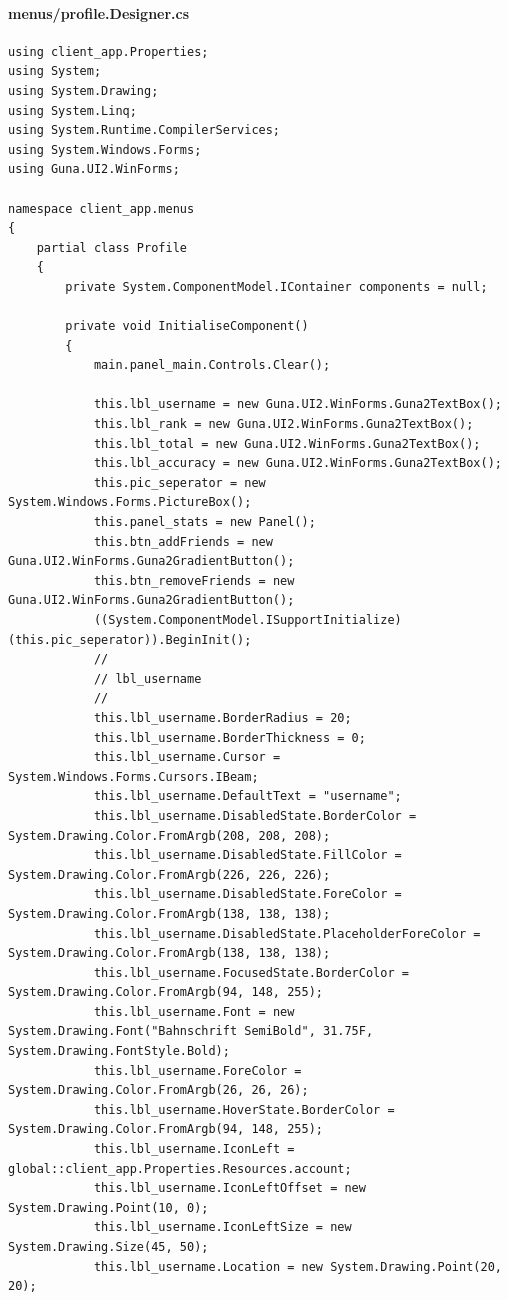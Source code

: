 \documentclass{article}
\begin{document}
\paragraph{menus/profile.Designer.cs}\label{client/menus/profile.designer.cs}
\begin{verbatim}
using client_app.Properties;
using System;
using System.Drawing;
using System.Linq;
using System.Runtime.CompilerServices;
using System.Windows.Forms;
using Guna.UI2.WinForms;

namespace client_app.menus
{
	partial class Profile
	{
		private System.ComponentModel.IContainer components = null;

		private void InitialiseComponent()
		{
			main.panel_main.Controls.Clear();

			this.lbl_username = new Guna.UI2.WinForms.Guna2TextBox();
			this.lbl_rank = new Guna.UI2.WinForms.Guna2TextBox();
			this.lbl_total = new Guna.UI2.WinForms.Guna2TextBox();
			this.lbl_accuracy = new Guna.UI2.WinForms.Guna2TextBox();
			this.pic_seperator = new System.Windows.Forms.PictureBox();
			this.panel_stats = new Panel();
			this.btn_addFriends = new Guna.UI2.WinForms.Guna2GradientButton();
			this.btn_removeFriends = new Guna.UI2.WinForms.Guna2GradientButton();
			((System.ComponentModel.ISupportInitialize)(this.pic_seperator)).BeginInit();
			// 
			// lbl_username
			// 
			this.lbl_username.BorderRadius = 20;
			this.lbl_username.BorderThickness = 0;
			this.lbl_username.Cursor = System.Windows.Forms.Cursors.IBeam;
			this.lbl_username.DefaultText = "username";
			this.lbl_username.DisabledState.BorderColor = System.Drawing.Color.FromArgb(208, 208, 208);
			this.lbl_username.DisabledState.FillColor = System.Drawing.Color.FromArgb(226, 226, 226);
			this.lbl_username.DisabledState.ForeColor = System.Drawing.Color.FromArgb(138, 138, 138);
			this.lbl_username.DisabledState.PlaceholderForeColor = System.Drawing.Color.FromArgb(138, 138, 138);
			this.lbl_username.FocusedState.BorderColor = System.Drawing.Color.FromArgb(94, 148, 255);
			this.lbl_username.Font = new System.Drawing.Font("Bahnschrift SemiBold", 31.75F, System.Drawing.FontStyle.Bold);
			this.lbl_username.ForeColor = System.Drawing.Color.FromArgb(26, 26, 26);
			this.lbl_username.HoverState.BorderColor = System.Drawing.Color.FromArgb(94, 148, 255);
			this.lbl_username.IconLeft = global::client_app.Properties.Resources.account;
			this.lbl_username.IconLeftOffset = new System.Drawing.Point(10, 0);
			this.lbl_username.IconLeftSize = new System.Drawing.Size(45, 50);
			this.lbl_username.Location = new System.Drawing.Point(20, 20);

\end{verbatim}
\end{document}
